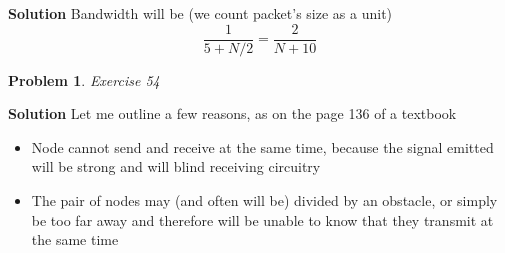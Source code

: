 \documentclass[11pt]{article} %
\newtheorem{prob}{Problem}
\newenvironment{solution}%
{\par\textbf{Solution}\space }%
{\par}
\begin{document}
\begin{solution}
	Bandwidth will be (we count packet's size as a unit)
	\[\frac{1}{5+N/2}=\frac{2}{N+10}\]
\end{solution}
\begin{prob}
	Exercise 54
\end{prob}
\begin{solution}
Let me outline a few reasons, as on the page 136 of a textbook
\begin{itemize}
	\item{Node cannot send and receive at the same time, because the signal emitted will be strong and will blind receiving 
		circuitry
		}
	\item{The pair of nodes may (and often will be) divided by an obstacle, or simply be too far away and therefore will be unable
		to know that they transmit at the same time}
\end{itemize}
\end{solution}
\end{document}

